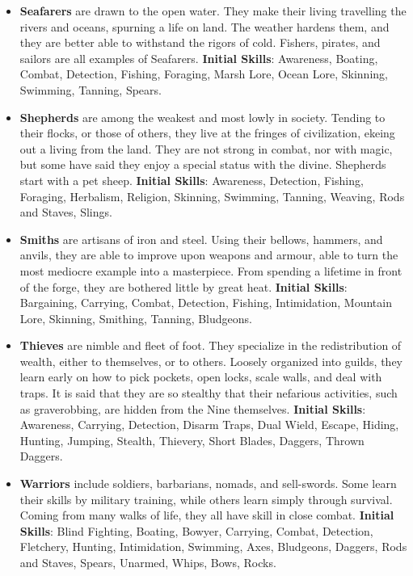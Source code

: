 \begin{itemize}
\item {\bf Seafarers} are drawn to the open water.  They make their living 
travelling the rivers and oceans, spurning a life on land.  The weather 
hardens them, and they are better able to withstand the rigors of cold.  
Fishers, pirates, and sailors are all examples of Seafarers.
\textbf{Initial Skills}: Awareness, Boating, Combat, Detection, Fishing,
Foraging, Marsh Lore, Ocean Lore, Skinning, Swimming, Tanning, Spears.

\item {\bf Shepherds} are among the weakest and most lowly in society.  
Tending to their flocks, or those of others, they live at the fringes of 
civilization, ekeing out a living from the land.  They are not strong in 
combat, nor with magic, but some have said they enjoy a special status 
with the divine.  Shepherds start with a pet sheep.  \textbf{Initial Skills}: 
Awareness, Detection, Fishing, Foraging, Herbalism, Religion, Skinning, 
Swimming, Tanning, Weaving, Rods and Staves, Slings.

\item {\bf Smiths} are artisans of iron and steel.  Using their bellows, 
hammers, and anvils, they are able to improve upon weapons and armour, 
able to turn the most mediocre example into a masterpiece.  From spending 
a lifetime in front of the forge, they are bothered little by great heat.
\textbf{Initial Skills}: Bargaining, Carrying, Combat, Detection, 
Fishing, Intimidation, Mountain Lore, Skinning, Smithing, Tanning,
Bludgeons.

\item {\bf Thieves} are nimble and fleet of foot.  They specialize in the 
redistribution of wealth, either to themselves, or to others.  Loosely 
organized into guilds, they learn early on how to pick pockets, open 
locks, scale walls, and deal with traps.  It is said that they are so
stealthy that their nefarious activities, such as graverobbing, are hidden
from the Nine themselves.  \textbf{Initial Skills}: Awareness, Carrying, 
Detection, Disarm Traps, Dual Wield, Escape, Hiding, Hunting, Jumping, 
Stealth, Thievery, Short Blades, Daggers, Thrown Daggers.

\item {\bf Warriors} include soldiers, barbarians, nomads, and sell-swords.
Some learn their skills by military training, while others learn simply 
through survival.  Coming from many walks of life, they all have skill in 
close combat.  \textbf{Initial Skills}: Blind Fighting, Boating, Bowyer,
Carrying, Combat, Detection, Fletchery, Hunting, Intimidation, Swimming,
Axes, Bludgeons, Daggers, Rods and Staves, Spears, Unarmed, Whips, Bows,
Rocks.


\end{itemize}
